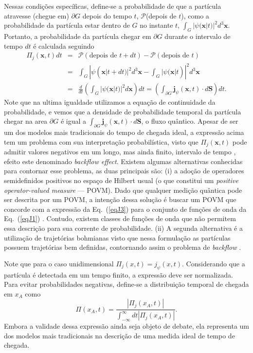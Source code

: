 Nessas condições específicas, define-se a probabilidade de que a partícula atravesse (chegue em) $\partial G$ depois do tempo $t$, $\mathcal{P}$(depois de $t$), como a probabilidade da partícula estar dentro de $G$ no instante $t$, $\int_G |\psi (\mathbf{x}|t)|^2 d^3 \mathbf{x}$. Portanto, a probabilidade da partícula chegar em $\partial G$ durante o intervalo de tempo $dt$ é calculada seguindo
\begin{eqnarray}\label{eqJ3}
    \Pi_j (\mathbf{x},t) dt &=& \mathcal{P}(\text{depois de } t + dt) - \mathcal{P}(\text{depois de } t) \nonumber\\ &=& \int_G |\psi(\mathbf{x}|t + dt)|^2 d^3 \mathbf{x} - \int_G |\psi(\mathbf{x}|t)|^2  d^3 \mathbf{x}\nonumber\\
        &=& \frac{d}{dt} \left( \int_G |\psi (\mathbf{x}| t)|^2 d \mathbf{x} \right)dt = \left( \int_{\partial G} \textbf{j}_{\psi} (\mathbf{x}, t) \cdot d\textbf{S} \right)dt.
\end{eqnarray}
 Note que na ultima igualdade utilizamos a equação de continuidade da probabilidade, e vemos que a densidade de probabilidade temporal da partícula chegar na area $\partial G$ é igual a $\int_{\partial G} \textbf{j}_{\psi} (\mathbf{x}, t) \cdot d\textbf{S}$, o fluxo quântico. Apesar de ser um dos modelos mais tradicionais do tempo de chegada ideal, a expressão acima tem um problema com sua interpretação probabilística, visto que $\Pi_{j} (\mathbf{x},t)$ pode admitir valores negativos em um longo, mas ainda finito, intervalo de tempo \cite{Das2}, efeito este denominado \textit{backflow effect}. Existem algumas alternativas conhecidas para contornar esse problema, as duas principais são: (i) a adoção de operadores semidefinidos positivos no espaço de Hilbert usual (o que constitui um \textit{positive operator-valued measure} --- POVM). Dado que qualquer medição quântica pode ser descrita por um POVM, a intenção dessa solução é buscar um POVM que concorde com a expressão da Eq.~(\ref{eqJ3}) para o conjunto de funções de onda da Eq.~(\ref{eqJ1}) \cite{4}. Contudo, existem classes de funções de onda que não permitem essa descrição para sua corrente de probabilidade. (ii) A segunda alternativa é a utilização de trajetórias bohmianas visto que nessa formulação as partículas possuem trajetórias bem definidas, contornando assim o problema de \textit{backflow} \cite{Das}. 
 
 Note que para o caso unidimensional $\Pi_j (x,t) = j_{\psi} (x,t)$. Considerando que a partícula é detectada em um tempo finito, a expressão deve ser normalizada. Para evitar probabilidades negativas, define-se a distribuição temporal de chegada em $x_A$ como
\begin{equation}\label{eqJ4}
\Pi (x_A,t) = \frac{|\Pi_{j} (x_A,t)|}{\int^{\infty}_{-\infty} dt |\Pi_{j} (x_A,t)|}.
\end{equation}
 Embora a validade dessa expressão ainda seja objeto de debate, ela representa um dos modelos mais tradicionais na descrição de uma medida ideal de tempo de chegada. 

